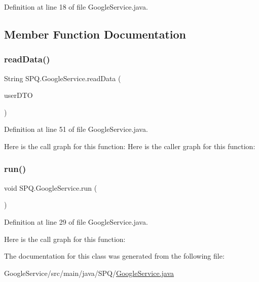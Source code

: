 Definition at line 18 of file Google\+Service.\+java.



\subsection{Member Function Documentation}
\mbox{\label{class_s_p_q_1_1_google_service_a94e224618cc0433776bcb49bff80067f}} 
\subsubsection{\texorpdfstring{read\+Data()}{readData()}}
{\footnotesize\ttfamily String S\+P\+Q.\+Google\+Service.\+read\+Data (\begin{DoxyParamCaption}\item[{\mbox{\hyperlink{class_s_p_q_1_1dto_1_1_user_d_t_o}{User\+D\+TO}}}]{user\+D\+TO }\end{DoxyParamCaption})}



Definition at line 51 of file Google\+Service.\+java.

Here is the call graph for this function\+:
Here is the caller graph for this function\+:
\mbox{\label{class_s_p_q_1_1_google_service_aecd41a7e761dc392fc96e096547dc504}} 
\subsubsection{\texorpdfstring{run()}{run()}}
{\footnotesize\ttfamily void S\+P\+Q.\+Google\+Service.\+run (\begin{DoxyParamCaption}{ }\end{DoxyParamCaption})}



Definition at line 29 of file Google\+Service.\+java.

Here is the call graph for this function\+:


The documentation for this class was generated from the following file\+:\begin{DoxyCompactItemize}
\item 
Google\+Service/src/main/java/\+S\+P\+Q/\mbox{\hyperlink{_google_service_8java}{Google\+Service.\+java}}\end{DoxyCompactItemize}
